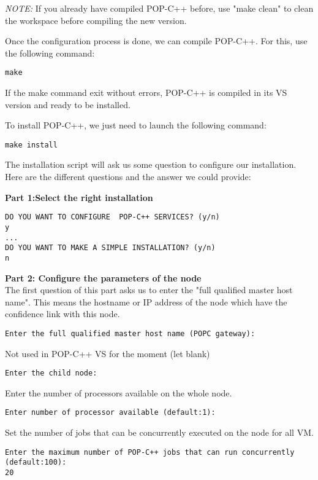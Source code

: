 \textit{NOTE:} If you already have compiled POP-C++ before, use "make clean" to clean the workspace before compiling the new version.\s

Once the configuration process is done, we can compile POP-C++. For this, use the following command: \s

\begin{lstlisting}
make
\end{lstlisting}\s

If the make command exit without errors, POP-C++ is compiled in its VS version and ready to be installed. \s

To install POP-C++, we just need to launch the following command:\s

\begin{lstlisting}
make install
\end{lstlisting}\s

The installation script will ask us some question to configure our installation. Here are the different questions and the answer we could provide:\s

\textbf{Part 1:Select the right installation}
\begin{lstlisting}
DO YOU WANT TO CONFIGURE  POP-C++ SERVICES? (y/n)
y
...
DO YOU WANT TO MAKE A SIMPLE INSTALLATION? (y/n) 
n
\end{lstlisting}\s

\pagebreak
\textbf{Part 2: Configure the parameters of the node}\\
The first question of this part asks us to enter the "full qualified master host name". This means the hostname or IP address of the node which have the confidence link with this node. 
\begin{lstlisting}
Enter the full qualified master host name (POPC gateway):

\end{lstlisting}\s

Not used in POP-C++ VS for the moment (let blank)
\begin{lstlisting}
Enter the child node:

\end{lstlisting}\s

Enter the number of processors available on the whole node. 
\begin{lstlisting}
Enter number of processor available (default:1):

\end{lstlisting}\s

Set the number of jobs that can be concurrently executed on the node for all VM.
\begin{lstlisting}
Enter the maximum number of POP-C++ jobs that can run concurrently 
(default:100):
20
\end{lstlisting}\s

